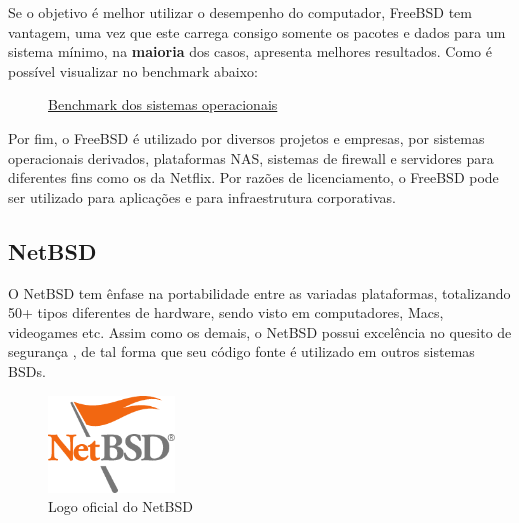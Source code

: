 \documentclass[a4paper,10pt]{article}
\begin{document}
Se o objetivo é melhor utilizar o desempenho do computador, FreeBSD tem vantagem, uma vez que este carrega consigo somente os pacotes e dados para um sistema mínimo, na \textbf{maioria} dos casos, apresenta melhores resultados. Como é possível visualizar no benchmark abaixo:

\begin{figure}
  \centering
  \caption{\href{https://www.phoronix.com/review/bsd-linux-eo2021/2}{Benchmark dos sistemas operacionais}}
  \label{fig:benchmark}
\end{figure}

Por fim, o FreeBSD é utilizado por diversos projetos e empresas, por sistemas operacionais derivados, plataformas NAS, sistemas de firewall e servidores para diferentes fins como os da Netflix. Por razões de licenciamento, o FreeBSD pode ser utilizado para aplicações e para infraestrutura corporativas.

\subsection{NetBSD}

O NetBSD tem ênfase na portabilidade entre as variadas plataformas, totalizando 50+ tipos diferentes de hardware, sendo visto em computadores, Macs, videogames etc. Assim como os demais, o NetBSD possui excelência no quesito de segurança \cite{mewburn2001design}, de tal forma que seu código fonte é utilizado em outros sistemas BSDs.

\begin{figure}[ht!]
    \centering
    \includegraphics[width=0.3\textwidth]{imagens/logo-netbsd.png}
    \caption{Logo oficial do NetBSD}
\end{figure}
\end{document}
